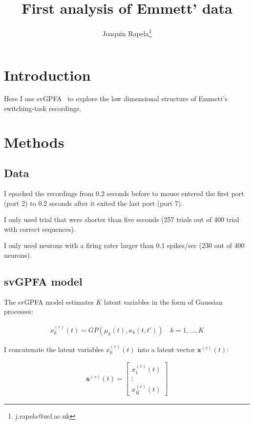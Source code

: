 \documentclass[12pt]{article}
\title{First analysis of Emmett' data}
\author{Joaqu\'{i}n Rapela\thanks{j.rapela@ucl.ac.uk}}
\begin{document}
\maketitle

\section{Introduction}

Here I use svGPFA~\citep{dunckerAndSahani18} to explore the low dimensional
structure of Emmett's switching-task recordings.

\section{Methods}

\subsection{Data}

I epoched the recordings from 0.2 seconds before to mouse entered the first
port (port 2) to 0.2 seconds after it exited the last port (port 7).

I only used trial that were shorter than five seconds (257 trials out of 400
trial with correct sequences).

I only used neurons with a firing rater larger than 0.1 spikes/sec (230
out of 400 neurons).

\subsection{svGPFA model}

The svGPFA model estimates $K$ latent variables in the form of Gaussian
processes:

\begin{align*}
    x_k^{(r)}(t)\sim GP(\mu_k(t), \kappa_k(t,t'))\quad k=1,\ldots,K
\end{align*}

\noindent I concatenate the latent variables $x_k^{(r)}(t)$ into a latent vector
$\mathbf{x}^{(r)}(t)$:

\begin{align}
    \mathbf{x}^{(r)}(t)=\left[\begin{array}{c}
        x_1^{(r)}(t)\\
                            \vdots\\
                            x_K^{(r)}(t)
                        \end{array}\right]
    \label{eq:latentsVector}
\end{align}
\end{document}
